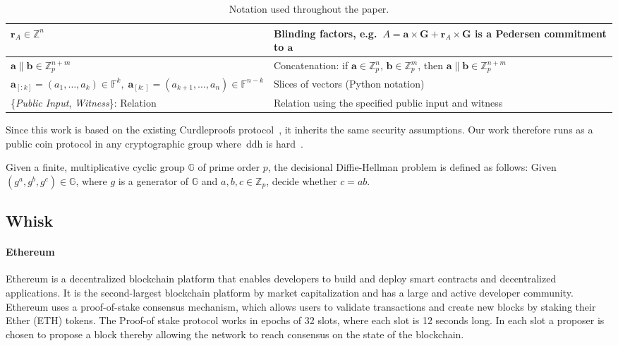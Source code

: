 \begin{table*}[ht]
\begin{tabular}{|l|l|}
        \hline
        $\mathbf{r}_A\in\mathbb{Z}^n$ & Blinding factors, e.g.\ $A=\mathbf{a}\times\mathbf{G} + \mathbf{r}_A \times \mathbf{G}$ is a Pedersen commitment to $\mathbf{a}$ \\
        \hline
        $\mathbf{a}\parallel \mathbf{b}\in\mathbb{Z}_p^{n+m}$
        & Concatenation: if $\mathbf{a}\in\mathbb{Z}_p^n$, $\mathbf{b}\in\mathbb{Z}_p^m$, then $\mathbf{a}\parallel \mathbf{b}\in\mathbb{Z}_p^{n+m}$ \\
        \hline
        $\mathbf{a}_{[:k]}=(a_1,\dots,a_k)\in\mathbb{F}^k, \; \mathbf{a}_{[k:]}=(a_{k+1},\dots,a_n)\in\mathbb{F}^{n-k}$
        & Slices of vectors (Python notation) \\
        \hline
        \{\textit{Public Input}, \textit{Witness}\}: Relation
        & Relation using the specified public input and witness \\
        \hline
    \end{tabular}
    \caption{Notation used throughout the paper.}
    \label{tab:notation}
\end{table*}


Since this work is based on the existing Curdleproofs protocol~\cite{Curdleproofs}, it inherits the same security assumptions.
Our work therefore runs as a public coin protocol in any cryptographic group where~\gls{ddh} is hard~\cite{10.1007/BFb0054851}.

\begin{definition}[DDH]
 Given a finite, multiplicative cyclic group $\mathbb{G}$ of prime order $p$, the decisional Diffie-Hellman problem is defined as follows: Given $(g^a,g^b,g^c)\in\mathbb{G}$, where $g$ is a generator of $\mathbb{G}$ and $a,b,c\in\mathbb{Z}_p$, decide whether $c=ab$.
\end{definition}

\subsection{Whisk}\label{sec:related-work-whisk}

\paragraph*{\textbf{Ethereum}}\label{sec:background-ethereum}
Ethereum is a decentralized blockchain platform that enables developers to build and deploy smart contracts and decentralized applications.
It is the second-largest blockchain platform by market capitalization and has a large and active developer community.
Ethereum uses a proof-of-stake consensus mechanism, which allows users to validate transactions and create new blocks by staking their Ether (ETH) tokens.
The Proof-of stake protocol works in epochs of 32 slots, where each slot is 12 seconds long.
In each slot a proposer is chosen to propose a block thereby allowing the network to reach consensus on the state of the blockchain.

